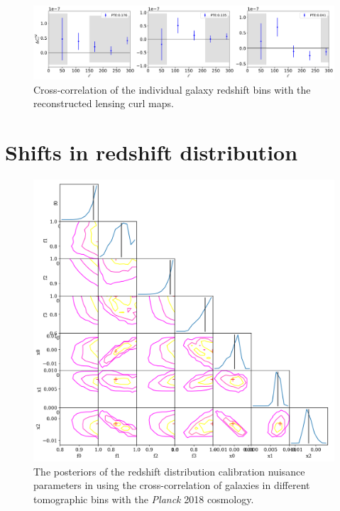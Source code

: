 \documentclass[twocolumn]{aastex631}
\begin{document}
{\begin{figure}
    \centering
\includegraphics[width=\linewidth]{figures/curl_gaussian.png}
    \caption{Cross-correlation of the individual galaxy redshift bins with the reconstructed lensing curl maps. }
    \label{fig:nullcurl}
\end{figure}


\section{Shifts in redshift distribution}
\label{apdx: dndz shifts}

\begin{figure}
    \centering
\includegraphics[width=\linewidth]{figures/nz-param-posteriors.png}
    \caption{The posteriors of the redshift distribution calibration nuisance parameters in \cite{hang2021} using the cross-correlation of galaxies in different tomographic bins with the \textit{Planck} 2018 cosmology.}
    \label{fig:nz-param-posteriors}
\end{figure}

}
\end{document}
